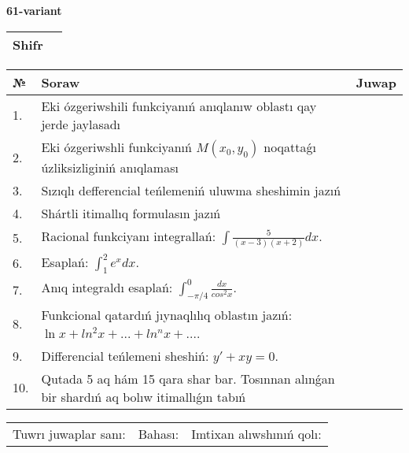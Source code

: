 \documentclass{article}
\begin{document}
  \egroup
  
  \newpage
  
  
  \textbf{61-variant}\\
  
  \bgroup
  \def\arraystretch{1.6} %
  
  \begin{tabular}{|m{5.7cm}|m{9.5cm}|}
  \hline
  Shifr & \\
  \hline
  \end{tabular}
  
  \vspace{1cm}
  
  \begin{tabular}{|m{0.7cm}|m{10cm}|m{4cm}|}
  \hline
  № & Soraw & Juwap \\
  \hline
  1. & Eki ózgeriwshili funkciyanıń anıqlanıw oblastı qay jerde jaylasadı &  \\
  \hline
  2. & Eki ózgeriwshli funkciyanıń \(M(x_{0}, y_{0})\) noqattaǵı úzliksizliginiń anıqlaması &  \\
  \hline
  3. & Sızıqlı defferencial teńlemeniń uluwma sheshimin jazıń &  \\
  \hline
  4. & Shártli itimallıq formulasın jazıń &  \\
  \hline
  5. & Racional funkciyanı integrallań: \(\int{\frac{5}{(x - 3)(x + 2)}dx}\). &  \\
  \hline
  6. & Esaplań: \(\int_{1}^2 {e^{x}dx}\). &  \\
  \hline
  7. & Anıq integraldı esaplań: \(\int_{- \pi/4}^{0}\frac{dx}{cos^2 x}\). &  \\
  \hline
  8. & Funkcional qatardıń jıynaqlılıq oblastın jazıń: \(\ln x + ln^2 x + ... + ln^{n}x + ...\). &  \\
  \hline
  9. & Differencial teńlemeni sheshiń: \(y' + xy = 0\). &  \\
  \hline
  10. & Qutada 5 aq hám 15 qara shar bar. Tosınnan alınǵan bir shardıń aq bolıw itimallıǵın tabıń &  \\
  \hline
  \end{tabular}
  
  \vspace{1cm}
  
  \begin{tabular}{lll}
  Tuwrı juwaplar sanı: \underline{\hspace{1.5cm}} & 
  Bahası: \underline{\hspace{1.5cm}} & 
  Imtixan alıwshınıń qolı: \underline{\hspace{2cm}} \\
  \end{tabular}
  
\end{document}
